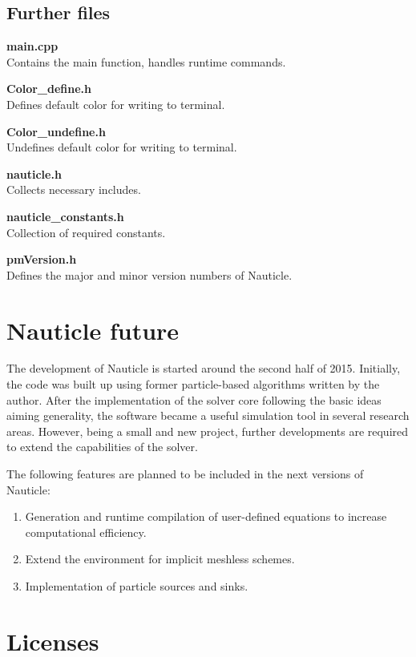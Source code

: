 \documentclass[a4paper,12pt,openany]{book}
\theoremstyle{break}
\begin{document}
\subsection{Further files}

\textbf{main.cpp} \\
Contains the main function, handles runtime commands.

\textbf{Color\_define.h} \\
Defines default color for writing to terminal.

\textbf{Color\_undefine.h} \\
Undefines default color for writing to terminal.

\textbf{nauticle.h} \\
Collects necessary includes.

\textbf{nauticle\_constants.h} \\
Collection of required constants.

\textbf{pmVersion.h} \\
Defines the major and minor version numbers of Nauticle.


\section{Nauticle future}
The development of Nauticle is started around the second half of 2015. Initially, the code was built up using former particle-based algorithms written by the author. After the implementation of the solver core following the basic ideas aiming generality, the software became a useful simulation tool in several research areas. However, being a small and new project, further developments are required to extend the capabilities of the solver.

The following features are planned to be included in the next versions of Nauticle:
\begin{enumerate}
\item Generation and runtime compilation of user-defined equations to increase computational efficiency.
\item Extend the environment for implicit meshless schemes.
\item Implementation of particle sources and sinks.
\end{enumerate}


\renewcommand{\bibname}{References}


\newpage
\section{Licenses}
\end{document}
